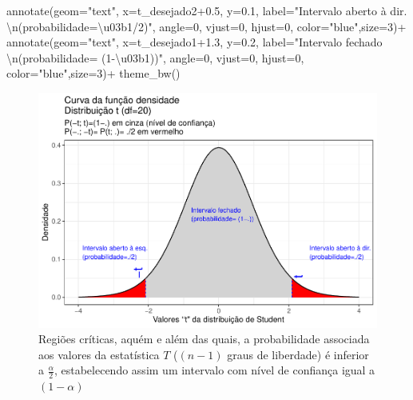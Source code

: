\documentclass[
]{book}
\newenvironment{Shaded}{\begin{snugshade}}{\end{snugshade}}
\newcommand{\AttributeTok}[1]{\textcolor[rgb]{0.77,0.63,0.00}{#1}}
\newcommand{\DecValTok}[1]{\textcolor[rgb]{0.00,0.00,0.81}{#1}}
\newcommand{\FloatTok}[1]{\textcolor[rgb]{0.00,0.00,0.81}{#1}}
\newcommand{\FunctionTok}[1]{\textcolor[rgb]{0.00,0.00,0.00}{#1}}
\newcommand{\NormalTok}[1]{#1}
\newcommand{\SpecialCharTok}[1]{\textcolor[rgb]{0.00,0.00,0.00}{#1}}
\newcommand{\StringTok}[1]{\textcolor[rgb]{0.31,0.60,0.02}{#1}}
\begin{document}
\begin{Shaded}
\begin{Highlighting}[]
  \FunctionTok{annotate}\NormalTok{(}\AttributeTok{geom=}\StringTok{"text"}\NormalTok{, }\AttributeTok{x=}\NormalTok{t\_desejado2}\FloatTok{+0.5}\NormalTok{, }\AttributeTok{y=}\FloatTok{0.1}\NormalTok{, }\AttributeTok{label=}\StringTok{"Intervalo aberto à dir. }\SpecialCharTok{\textbackslash{}n}\StringTok{(probabilidade=\textbackslash{}u03b1/2)"}\NormalTok{, }\AttributeTok{angle=}\DecValTok{0}\NormalTok{, }\AttributeTok{vjust=}\DecValTok{0}\NormalTok{, }\AttributeTok{hjust=}\DecValTok{0}\NormalTok{, }\AttributeTok{color=}\StringTok{"blue"}\NormalTok{,}\AttributeTok{size=}\DecValTok{3}\NormalTok{)}\SpecialCharTok{+}
  \FunctionTok{annotate}\NormalTok{(}\AttributeTok{geom=}\StringTok{"text"}\NormalTok{, }\AttributeTok{x=}\NormalTok{t\_desejado1}\FloatTok{+1.3}\NormalTok{, }\AttributeTok{y=}\FloatTok{0.2}\NormalTok{, }\AttributeTok{label=}\StringTok{"Intervalo fechado }\SpecialCharTok{\textbackslash{}n}\StringTok{(probabilidade= (1{-}\textbackslash{}u03b1))"}\NormalTok{, }\AttributeTok{angle=}\DecValTok{0}\NormalTok{, }\AttributeTok{vjust=}\DecValTok{0}\NormalTok{, }\AttributeTok{hjust=}\DecValTok{0}\NormalTok{, }\AttributeTok{color=}\StringTok{"blue"}\NormalTok{,}\AttributeTok{size=}\DecValTok{3}\NormalTok{)}\SpecialCharTok{+}  \FunctionTok{theme\_bw}\NormalTok{()}
\end{Highlighting}
\end{Shaded}

\begin{figure}

{\centering \includegraphics[width=1\linewidth]{apostila_files/figure-latex/fig62-1} 

}

\caption{Regiões críticas, aquém e além das quais, a probabilidade associada aos valores da estatística $T$ ($(n-1)$ graus de liberdade) é inferior a $\frac{\alpha}{2}$, estabelecendo assim um intervalo com nível de confiança igual a $(1-\alpha)$}\label{fig:fig62}
\end{figure}
\end{document}
